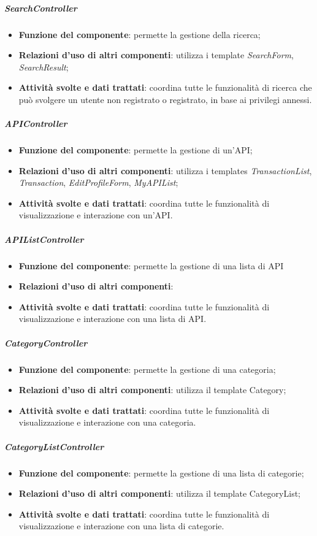 \subparagraph{SearchController}
\begin{itemize}
	\item \textbf{Funzione del componente}: permette la gestione della ricerca;
	\item \textbf{Relazioni d’uso di altri componenti}: utilizza i template \textit{SearchForm}, \textit{SearchResult};
	\item \textbf{Attività svolte e dati trattati}: coordina tutte le funzionalità di ricerca che può svolgere un utente non registrato o registrato, in base ai privilegi annessi.
\end{itemize}

\subparagraph{APIController}
\begin{itemize}
	\item \textbf{Funzione del componente}: permette la gestione di un'API;
	\item \textbf{Relazioni d’uso di altri componenti}: utilizza i templates \textit{TransactionList}, \textit{Transaction}, \textit{EditProfileForm}, \textit{MyAPIList};
	\item \textbf{Attività svolte e dati trattati}: coordina tutte le funzionalità di visualizzazione e interazione con un'API.
\end{itemize}

\subparagraph{APIListController}
\begin{itemize}
	\item \textbf{Funzione del componente}: permette la gestione di una lista di API
	\item \textbf{Relazioni d’uso di altri componenti}: 
	\item \textbf{Attività svolte e dati trattati}: coordina tutte le funzionalità di visualizzazione e interazione con una lista di API.
\end{itemize}

\subparagraph{CategoryController}
\begin{itemize}
	\item \textbf{Funzione del componente}: permette la gestione di una categoria;
	\item \textbf{Relazioni d’uso di altri componenti}: utilizza il template Category;
	\item \textbf{Attività svolte e dati trattati}: coordina tutte le funzionalità di visualizzazione e interazione con una categoria.
\end{itemize}

\subparagraph{CategoryListController}
\begin{itemize}
	\item \textbf{Funzione del componente}: permette la gestione di una lista di categorie;
	\item \textbf{Relazioni d’uso di altri componenti}: utilizza il template CategoryList;
	\item \textbf{Attività svolte e dati trattati}: coordina tutte le funzionalità di visualizzazione e interazione con una lista di categorie.
\end{itemize}

